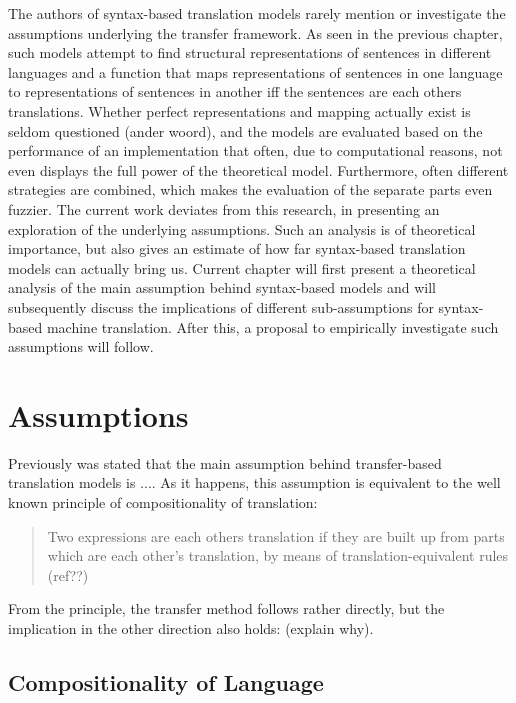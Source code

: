 \documentclass{report}
\theoremstyle{indented}
\begin{document}
The authors of syntax-based translation models rarely mention or investigate the assumptions underlying the transfer framework. As seen in the previous chapter, such models attempt to find structural representations of sentences in different languages and a function that maps representations of sentences in one language to representations of sentences in another iff the sentences are each others translations. Whether perfect representations and mapping actually exist is seldom questioned (ander woord), and the models are evaluated based on the performance of an implementation that often, due to computational reasons, not even displays the full power of the theoretical model. Furthermore, often different strategies are combined, which makes the evaluation of the separate parts even fuzzier. The current work deviates from this research, in presenting an exploration of the underlying assumptions. Such an analysis is of theoretical importance, but also gives an estimate of how far syntax-based translation models can actually bring us. Current chapter will first present a theoretical analysis of the main assumption behind syntax-based models and will subsequently discuss the implications of different sub-assumptions for syntax-based machine translation. After this, a proposal to empirically investigate such assumptions will follow.

\section{Assumptions}

Previously was stated that the main assumption behind transfer-based translation models is ....
As it happens, this assumption is equivalent to the well known principle of compositionality of translation:

\begin{quote}
Two expressions are each others translation if they are built up from parts which are each other's translation, by means of translation-equivalent rules (ref??)
\end{quote}

From the principle, the transfer method follows rather directly, but the implication in the other direction also holds: (explain why).


\subsection{Compositionality of Language}
\end{document}
